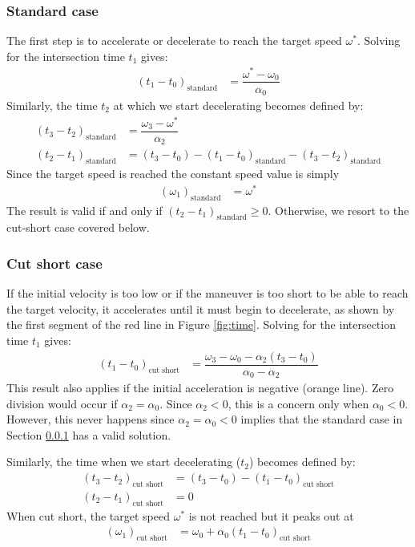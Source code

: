 \documentclass[12pt, a4paper]
{article}
\providecommand{\lr}[1]{\left(#1\right)}
\providecommand{\sub}[1]{_{\text{#1}}}
\providecommand{\w}{\omega}
\providecommand{\wt}{\w^*}
\renewcommand{\a}{\alpha}
\providecommand{\w}{\omega}
\begin{document}
\subsubsection{Standard case}
\label{sec:t:standard}
The first step is to accelerate or decelerate to reach the target speed $\wt$.
Solving for the intersection time $t_1$ gives:
%
\begin{align}
    \label{eq:t:t1mt0:standard}
    \lr{t_1 - t_0}\sub{standard} &= \dfrac{\wt-\w_0}{\a_0}
\end{align}
%
Similarly, the time $t_2$ at which we start decelerating becomes defined by:
%
\begin{align}
    \label{eq:t:t3mt2:standard}
    \lr{t_3 - t_2}\sub{standard} &= \dfrac{\w_3-\wt}{\a_2}\\[1em]
    \label{eq:t:t2mt1:standard}
    \lr{t_2 - t_1}\sub{standard} &=
        (t_3-t_0) - \lr{t_1 - t_0}\sub{standard} - \lr{t_3 - t_2}\sub{standard}
\end{align}
%
Since the target speed is reached the constant speed value is simply
\begin{align}
    \lr{\w_1}\sub{standard} &= \wt
\end{align}
%
The result is valid if and only if $\lr{t_2 - t_1}\sub{standard}\geq 0$.
Otherwise, we resort to the cut-short case covered below.

\subsubsection{Cut short case}
\label{sec:t:cutshort}
If the initial velocity is too low or if the maneuver is too short to be able
to reach the target velocity, it accelerates until it must begin to
decelerate, as shown by the first segment of the red line in Figure
\ref{fig:time}. Solving for the intersection time $t_1$
gives:
%
\begin{align}
    \label{eq:t:t1mt0:cutshort}
    \lr{t_1 - t_0}\sub{cut short} &=
        \dfrac{\w_3-\w_0 - \a_2(t_3-t_0)}{\a_0-\a_2}
\end{align}
%
This result also applies if the initial acceleration is negative (orange line).
Zero division would occur if $\a_2 = \a_0$. Since $\a_2 < 0$, this is a concern
only when $\a_0 < 0$. However, this never happens since $\a_2 = \a_0 < 0$
implies that the standard case in Section \ref{sec:t:standard} has a valid
solution.

Similarly, the time when we start decelerating ($t_2$) becomes defined by:
%
\begin{align}
    \label{eq:t:t3mt2:cutshort}
    \lr{t_3 - t_2}\sub{cut short} &= (t_3 - t_0) - (t_1 - t_0)\sub{cut short}
    \\[1em]
    \label{eq:t:t2mt1:cutshort}
    \lr{t_2 - t_1}\sub{cut short} &= 0
\end{align}
%
When cut short, the target speed $\wt$ is not reached but it peaks out at
%
\begin{align}
    \lr{\w_1}\sub{cut short} &= \w_0 + \a_0(t_1 - t_0)\sub{cut short}
\end{align}
\end{document}

